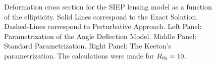 \begin{figure}[!ht]
{}
\caption{\label{dcs_siep_e_pm} Deformation cross section for the  SIEP lensing
model as a function of the ellipticity. Solid Lines correspond to the Exact
Solution. Dashed-Lines correspond to Perturbative Approach. Left Panel:
Parametrization of the Angle Deflection Model. Middle Panel: Standard
Parametrization. Right Panel: The Keeton's parametrization. The calculations
were
made for $R_{\rm th}=10$.}
\end{figure}

